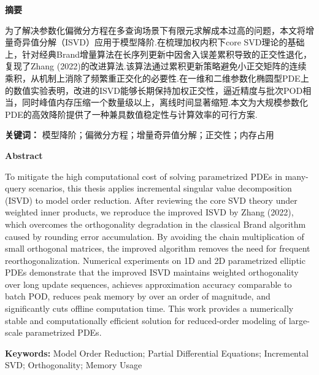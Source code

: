 \begin{center}
    \bfseries {} 摘要
\end{center}

为了解决参数化偏微分方程在多查询场景下有限元求解成本过高的问题，本文将增量奇异值分解（ISVD）应用于模型降阶.在梳理加权内积下core SVD理论的基础上，针对经典Brand增量算法在长序列更新中因舍入误差累积导致的正交性退化，复现了Zhang (2022)的改进算法.该算法通过累积更新策略避免小正交矩阵的连续乘积，从机制上消除了频繁重正交化的必要性.在一维和二维参数化椭圆型PDE上的数值实验表明，改进的ISVD能够长期保持加权正交性，逼近精度与批次POD相当，同时峰值内存压缩一个数量级以上，离线时间显著缩短.本文为大规模参数化PDE的高效降阶提供了一种兼具数值稳定性与计算效率的可行方案.
\vspace{1em}
\par\textbf{关键词：} 模型降阶；偏微分方程；增量奇异值分解；正交性；内存占用

\begin{center}
    \bfseries {} Abstract
\end{center}

To mitigate the high computational cost of solving parametrized PDEs in many-query scenarios, this thesis applies incremental singular value decomposition (ISVD) to model order reduction. After reviewing the core SVD theory under weighted inner products, we reproduce the improved ISVD by Zhang (2022), which overcomes the orthogonality degradation in the classical Brand algorithm caused by rounding error accumulation. By avoiding the chain multiplication of small orthogonal matrices, the improved algorithm removes the need for frequent reorthogonalization. Numerical experiments on 1D and 2D parametrized elliptic PDEs demonstrate that the improved ISVD maintains weighted orthogonality over long update sequences, achieves approximation accuracy comparable to batch POD, reduces peak memory by over an order of magnitude, and significantly cuts offline computation time. This work provides a numerically stable and computationally efficient solution for reduced-order modeling of large-scale parametrized PDEs.
\vspace{1em}
\par\textbf{Keywords:} Model Order Reduction; Partial Differential Equations; Incremental SVD; Orthogonality; Memory Usage